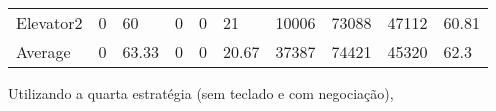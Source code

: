 \documentclass[a4paper]{article}
\begin{document}
\begin{table}[h]
\begin{tabular}{@{}llllllllll@{}}
Elevator2 & 0        & 60            & 0           & 0                                                               & 21                                                                  & 10006                                                         & 73088                                                 & 47112                                                   & 60.81         \\
Average   & 0     & 63.33         & 0        & 0                                                               & 20.67                                                               & 37387                                                         & 74421                                                 &  45320                                                  & 62.3         \\ \bottomrule
\end{tabular}
\end{table}

Utilizando a quarta estratégia  (sem teclado e com negociação),
\end{document}
